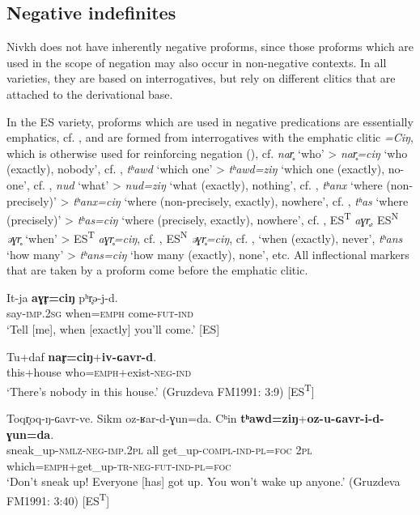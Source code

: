 \documentclass[output=paper,colorlinks,citecolor=brown]{langscibook}
\begin{document}
\subsection{Negative indefinites}\label{sec:niv:3.2} 

Nivkh does not have inherently negative proforms, since those proforms which are used in the scope of negation may also occur in non-negative contexts. In all varieties, they are based on interrogatives, but rely on different clitics that are attached to the derivational base.

In the ES variety, proforms which are used in negative predications are essentially emphatics, cf. , and are formed from interrogatives with the emphatic clitic \textit{=Ciŋ}, which is otherwise used for reinforcing negation (), cf. \textit{nar̥} ‘who’ > \textit{nar̥=ciŋ} ‘who (exactly), nobody’, cf. , \textit{tʰawd} ‘which one’ > \textit{tʰawd=ziŋ} ‘which one (exactly), no-one’, cf. , \textit{nud} ‘what’ > \textit{nud=ziŋ} ‘what (exactly), nothing’, cf. , \textit{tʰanx} ‘where (non-precisely)’ > \textit{tʰanx=ciŋ} ‘where (non-precisely, exactly), nowhere’, cf. , \textit{tʰas} ‘where (precisely)’ > \textit{tʰas=ciŋ} ‘where (precisely, exactly), nowhere’, cf. , ES\textsuperscript{T} \textit{aɣr̥}, ES\textsuperscript{N} \textit{əɣr̥} ‘when’ > ES\textsuperscript{T} \textit{aɣr̥=ciŋ}, cf. , ES\textsuperscript{N} \textit{əɣr̥=ciŋ}, cf. , ‘when (exactly), never’, \textit{tʰans} ‘how many’ > \textit{tʰans=ciŋ} ‘how many (exactly), none’, etc. All inflectional markers that are taken by a proform come before the emphatic clitic.

\ea\label{ex:niv:116}
    \gll It-ja \textbf{aɣr̥=ciŋ} pʰr̥ə-j-d. \\ 
         say-\textsc{imp.2sg} when=\textsc{emph} come-\textsc{fut-ind} \\
    \glt ‘Tell [me], when [exactly] you’ll come.’ [ES]
\z 

\ea\label{ex:niv:117}
    \gll Tu+daf \textbf{nar̥=ciŋ}+\textbf{iv-ɢavr-d}. \\ 
         this+house who=\textsc{emph}+exist-\textsc{neg-ind} \\
    \glt ‘There’s nobody in this house.’ (Gruzdeva FM1991: 3:9) [ES\textsuperscript{T}]
\z 

\ea\label{ex:niv:118}
    \gll Toqr̥oq-ŋ-ɢavr-ve. Sikm oz-ʁar-d-ɣun=da. Cʰin  \textbf{tʰawd=ziŋ}+\textbf{oz-u-ɢavr-i-d-ɣun=da}.\\ 
         sneak\_up-\textsc{nmlz}{}-\textsc{neg-imp.2pl} all get\_up-\textsc{compl-ind-pl=foc} 2\textsc{pl} which=\textsc{emph}+get\_up-\textsc{tr-neg-fut-ind-pl=foc}\\
    \glt ‘Don’t sneak up! Everyone [has] got up. You won’t wake up anyone.’ (Gruzdeva FM1991: 3:40) [ES\textsuperscript{T}]
\z 
\end{document}
